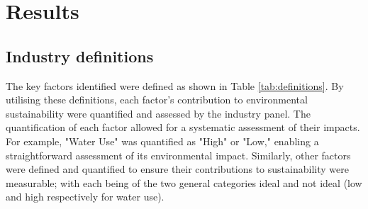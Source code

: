 









\section{Results}

\subsection{Industry definitions}

The key factors identified were defined as shown in Table \ref{tab:definitions}. By utilising these definitions, each factor's contribution to environmental sustainability were quantified and assessed by the industry panel. The quantification of each factor allowed for a systematic assessment of their impacts. For example, "Water Use" was quantified as "High" or "Low," enabling a straightforward assessment of its environmental impact. Similarly, other factors were defined and quantified to ensure their contributions to sustainability were measurable; with each being of the two general categories ideal and not ideal (low and high respectively for water use).

